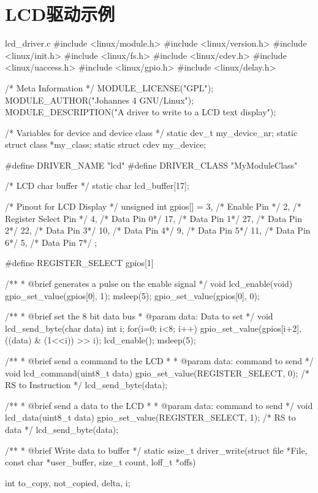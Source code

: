 \documentclass[lang=cn,newtx,10pt,scheme=chinese]{elegantbook}
\begin{document}
\chapter{LCD驱动示例}

\begin{mycode}{lcd\_driver.c}
#include <linux/module.h>
#include <linux/version.h>
#include <linux/init.h>
#include <linux/fs.h>
#include <linux/cdev.h>
#include <linux/uaccess.h>
#include <linux/gpio.h>
#include <linux/delay.h>

/* Meta Information */
MODULE_LICENSE("GPL");
MODULE_AUTHOR("Johannes 4 GNU/Linux");
MODULE_DESCRIPTION("A driver to write to a LCD text display");

/* Variables for device and device class */
static dev_t my_device_nr;
static struct class *my_class;
static struct cdev my_device;

#define DRIVER_NAME "lcd"
#define DRIVER_CLASS "MyModuleClass"

/* LCD char buffer */
static char lcd_buffer[17];

/* Pinout for LCD Display */
unsigned int gpios[] = {
    3, /* Enable Pin */
    2, /* Register Select Pin */
    4, /* Data Pin 0*/
    17, /* Data Pin 1*/
    27, /* Data Pin 2*/
    22, /* Data Pin 3*/
    10, /* Data Pin 4*/
    9, /* Data Pin 5*/
    11, /* Data Pin 6*/
    5, /* Data Pin 7*/
};

#define REGISTER_SELECT gpios[1]

/**
 * @brief generates a pulse on the enable signal
 */
void lcd_enable(void) {
    gpio_set_value(gpios[0], 1);
    msleep(5);
    gpio_set_value(gpios[0], 0);
}

/**
 * @brief set the 8 bit data bus
 * @param data: Data to set
 */
void lcd_send_byte(char data) {
    int i;
    for(i=0; i<8; i++)
        gpio_set_value(gpios[i+2], ((data) & (1<<i)) >> i);
    lcd_enable();
    msleep(5);
}

/**
 * @brief send a command to the LCD
 *
 * @param data: command to send
 */
void lcd_command(uint8_t data) {
     gpio_set_value(REGISTER_SELECT, 0);    /* RS to Instruction */
    lcd_send_byte(data);
}

/**
 * @brief send a data to the LCD
 *
 * @param data: command to send
 */
void lcd_data(uint8_t data) {
     gpio_set_value(REGISTER_SELECT, 1);    /* RS to data */
    lcd_send_byte(data);
}


/**
 * @brief Write data to buffer
 */
static ssize_t driver_write(struct file *File, const char *user_buffer, size_t count, loff_t *offs) {
    int to_copy, not_copied, delta, i;

}
\end{mycode}
\end{document}
